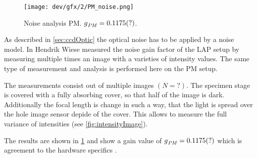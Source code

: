 % 
% 
\begin{figure}[!t]
\centering
\texttt{[image: dev/gfx/2/PM\_noise.png]}
\caption[Noise analysis]{Noise analysis PM. $\textnormal{$g$}_{\mathit{PM}} = \SI{0.1175}{}(?)$. }
\label{fig:parameterModelSimGain}
\end{figure}
% 
As described in \cref{sec:ccdOptic} the optical noise has to be applied by a noise model.
In \cite{Wiese:887678} Hendrik Wiese measured the noise gain factor of the \ac{LAP} setup by measuring multiple times an image with a varieties of intensity values.
The same type of measurement and analysis is performed here on the \ac{PM} setup.

The measurements consist out of multiple images $(N=?)$. The specimen stage is covered with a fully absorbing cover, so that half of the image is dark.
Additionally the focal length is change in such a way, that the light is spread over the hole image sensor depide of the cover.
This allows to measure the full variance of intensities (see \cref{fig:intensityImage}).

The results are shown in \cref{fig:parameterModelSimGain} and show a gain value of $\textnormal{$g$}_{\mathit{PM}} = \SI{0.1175}{}(?)$ which is agreement to the hardware specifics .
% 
% 
% 
